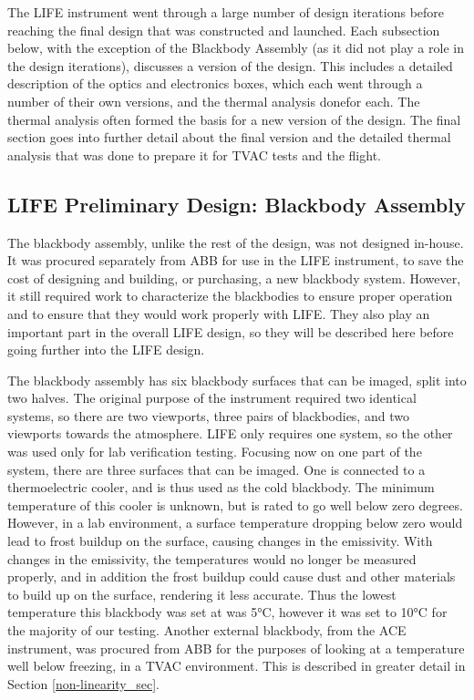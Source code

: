 The LIFE instrument went through a large number of design iterations before reaching the final design that was constructed and launched. Each subsection below, with the exception of the Blackbody Assembly (as it did not play a role in the design iterations), discusses a version of the design. This includes a detailed description of the optics and electronics boxes, which each went through a number of their own versions, and the thermal analysis donefor each. The thermal analysis often formed the basis for a new version of the design. The final section goes into further detail about the final version and the detailed thermal analysis that was done to prepare it for TVAC tests and the flight.
\subsection{LIFE Preliminary Design: Blackbody Assembly}\label{blackbody_assem_sec}
The blackbody assembly, unlike the rest of the design, was not designed in-house. It was procured separately from ABB for use in the LIFE instrument, to save the cost of designing and building, or purchasing, a new blackbody system. However, it still required work to characterize the blackbodies to ensure proper operation and to ensure that they would work properly with LIFE. They also play an important part in the overall LIFE design, so they will be described here before going further into the LIFE design.

The blackbody assembly has six blackbody surfaces that can be imaged, split into two halves. The original purpose of the instrument required two identical systems, so there are two viewports, three pairs of blackbodies, and two viewports towards the atmosphere. LIFE only requires one system, so the other was used only for lab verification testing. Focusing now on one part of the system, there are three surfaces that can be imaged. One is connected to a thermoelectric cooler, and is thus used as the cold blackbody. The minimum temperature of this cooler is unknown, but is rated to go well below zero degrees. However, in a lab environment, a surface temperature dropping below zero would lead to frost buildup on the surface, causing changes in the emissivity. With changes in the emissivity, the temperatures would no longer be measured properly, and in addition the frost buildup could cause dust and other materials to build up on the surface, rendering it less accurate. Thus the lowest temperature this blackbody was set at was 5°C, however it was set to 10°C for the majority of our testing. Another external blackbody, from the ACE instrument, was procured from ABB for the purposes of looking at a temperature well below freezing, in a TVAC environment. This is described in greater detail in Section \ref{non-linearity_sec}. 

